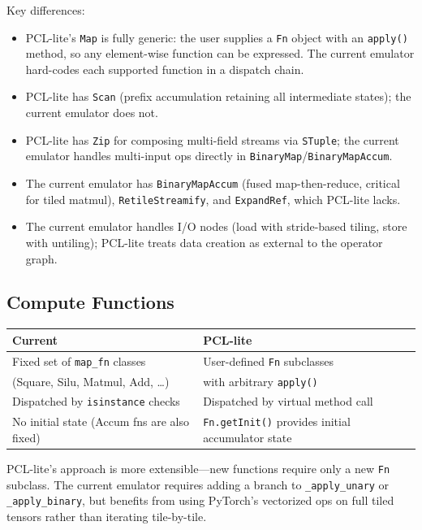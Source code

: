 \documentclass[11pt]{article}
\begin{document}
Key differences:
\begin{itemize}[leftmargin=*]
  \item PCL-lite's \texttt{Map} is fully generic: the user supplies a \texttt{Fn} object with an \texttt{apply()} method, so any element-wise function can be expressed.
        The current emulator hard-codes each supported function in a dispatch chain.
  \item PCL-lite has \texttt{Scan} (prefix accumulation retaining all intermediate states); the current emulator does not.
  \item PCL-lite has \texttt{Zip} for composing multi-field streams via \texttt{STuple}; the current emulator handles multi-input ops directly in \texttt{BinaryMap}/\texttt{BinaryMapAccum}.
  \item The current emulator has \texttt{BinaryMapAccum} (fused map-then-reduce, critical for tiled matmul), \texttt{RetileStreamify}, and \texttt{ExpandRef}, which PCL-lite lacks.
  \item The current emulator handles I/O nodes (load with stride-based tiling, store with untiling); PCL-lite treats data creation as external to the operator graph.
\end{itemize}

\subsection{Compute Functions}

\begin{center}
\begin{tabular}{ll}
\toprule
\textbf{Current} & \textbf{PCL-lite} \\
\midrule
Fixed set of \texttt{map\_fn} classes & User-defined \texttt{Fn} subclasses \\
(Square, Silu, Matmul, Add, \ldots) & with arbitrary \texttt{apply()} \\
Dispatched by \texttt{isinstance} checks & Dispatched by virtual method call \\
No initial state (Accum fns are also fixed) & \texttt{Fn.getInit()} provides initial accumulator state \\
\bottomrule
\end{tabular}
\end{center}

PCL-lite's approach is more extensible---new functions require only a new \texttt{Fn} subclass.
The current emulator requires adding a branch to \texttt{\_apply\_unary} or \texttt{\_apply\_binary}, but benefits from using PyTorch's vectorized ops on full tiled tensors rather than iterating tile-by-tile.
\end{document}
